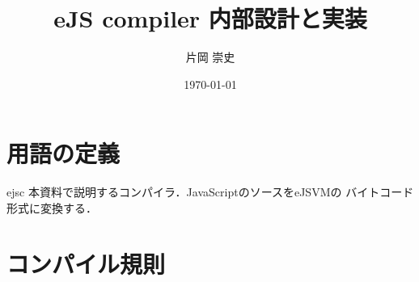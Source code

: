 \documentclass[a4j,12pt]{jarticle}
\title{eJS compiler 内部設計と実装}
\author{片岡 崇史}
\date{\today}
\begin{document}
\maketitle


\section{用語の定義}

\begin{description}
\item{ejsc} 本資料で説明するコンパイラ．JavaScriptのソースをeJSVMの
  バイトコード形式に変換する．
\end{description}



\section{コンパイル規則}
\end{document}
